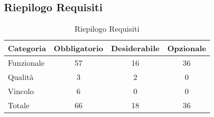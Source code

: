 \subsection{Riepilogo Requisiti}{ 
\renewcommand*{\arraystretch}{1.4} 
\begin{table}[h] 
 \begin{center} 
\begin{tabular}[c]{| p{2.5cm} | c | c | c |}  
\hline \textbf{Categoria} & \textbf{Obbligatorio} & \textbf{Desiderabile} & \textbf{Opzionale} \\ \hline 
Funzionale & 57 & 16 & 36\\ 
 \hline 
Qualità & 3 & 2 & 0\\ 
 \hline 
Vincolo & 6 & 0 & 0\\ 
 \hline 
Totale & 66 & 18 & 36\\ 
 \hline 
\end{tabular} 
 \caption{Riepilogo Requisiti\label{tab:riepilogo}}\end{center} 
 \end{table}}